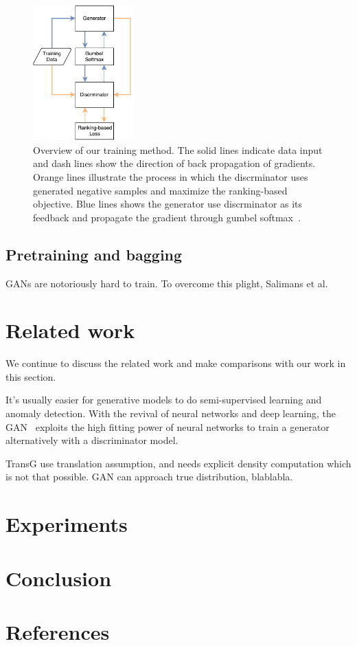\documentclass[twocolumn,a4paper,10pt,review,5p]{elsarticle}
\begin{document}
\begin{figure}[ht]
    \centering
    \includegraphics[width=0.35\textwidth]{overview.pdf}
    \caption{Overview of our training method. The solid lines indicate data input and dash lines show the direction of back propagation of gradients. Orange lines illustrate the process in which the discrminator uses generated negative samples and maximize the ranking-based objective. Blue lines shows the generator use discrminator as its feedback and propagate the gradient through gumbel softmax~\cite{GumbelSoftmax_Jiang_2016}.}
\label{system-overview}
\end{figure}

\subsection{Pretraining and bagging}

GANs are notoriously hard to train. To overcome this plight, Salimans et al.~\cite{}





\section{Related work}

We continue to discuss the related work and make comparisons with our work in this section.

It's usually easier for generative models to do semi-supervised learning and anomaly detection. With the revival of neural networks and deep learning, the GAN~\cite{GAN} exploits the high fitting power of neural networks to train a generator alternatively with a discriminator model. 

TransG use translation assumption, and needs explicit density computation which is not that possible.
GAN can approach true distribution, blablabla.


\section{Experiments}


\section{Conclusion}

\section*{References}


\end{document}
